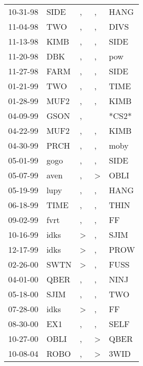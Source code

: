 \begin{supertabular}{lllll}
 10-31-98 &   SIDE &             , &                , &   HANG \\
 11-04-98 &    TWO &             , &                , &   DIVS \\
 11-13-98 &   KIMB &             , &                , &   SIDE \\
 11-20-98 &    DBK &             , &                , &    pow \\
 11-27-98 &   FARM &             , &                , &   SIDE \\
 01-21-99 &    TWO &             , &                , &   TIME \\
 01-28-99 &   MUF2 &             , &                , &   KIMB \\
 04-09-99 &   GSON &             , &                  &  *CS2* \\
 04-22-99 &   MUF2 &             , &                , &   KIMB \\
 04-30-99 &   PRCH &             , &                , &   moby \\
 05-01-99 &   gogo &             , &                , &   SIDE \\
 05-07-99 &   aven &             , &     \textgreater &   OBLI \\
 05-19-99 &   lupy &             , &                , &   HANG \\
 06-18-99 &   TIME &             , &                , &   THIN \\
 09-02-99 &   fvrt &             , &                , &     FF \\
 10-16-99 &   idks &  \textgreater &                , &   SJIM \\
 12-17-99 &   idks &  \textgreater &                , &   PROW \\
 02-26-00 &   SWTN &  \textgreater &                , &   FUSS \\
 04-01-00 &   QBER &             , &                , &   NINJ \\
 05-18-00 &   SJIM &             , &                , &    TWO \\
 07-28-00 &   idks &  \textgreater &                , &     FF \\
 08-30-00 &    EX1 &             , &                , &   SELF \\
 10-27-00 &   OBLI &             , &     \textgreater &   QBER \\
 10-08-04 &   ROBO &             , &     \textgreater &   3WID \\

\end{supertabular}
